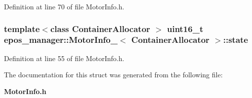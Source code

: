 \-Definition at line 70 of file \-Motor\-Info.\-h.

\subsubsection[{state}]{\setlength{\rightskip}{0pt plus 5cm}template$<$class Container\-Allocator $>$ uint16\-\_\-t {\bf epos\-\_\-manager\-::\-Motor\-Info\-\_\-}$<$ \-Container\-Allocator $>$\-::{\bf state}}\label{structepos__manager_1_1MotorInfo___aa79dcaa8ea2171d081cc17d70f23001a}


\-Definition at line 55 of file \-Motor\-Info.\-h.



\-The documentation for this struct was generated from the following file\-:\begin{DoxyCompactItemize}
\item 
{\bf \-Motor\-Info.\-h}\end{DoxyCompactItemize}
